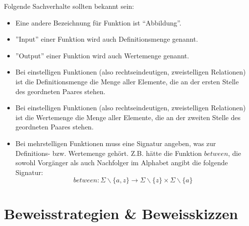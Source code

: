 Folgende Sachverhalte sollten bekannt sein:
\begin{itemize}
    \item Eine andere Bezeichnung für Funktion ist ``Abbildung''.
    \item ''Input'' einer Funktion wird auch Definitionsmenge genannt.
    \item ''Output'' einer Funktion wird auch Wertemenge genannt.
    \item Bei einstelligen Funktionen (also rechtseindeutigen, zweistelligen Relationen)
        ist die Definitionsmenge die Menge aller Elemente,
        die an der ersten Stelle des geordneten Paares stehen.
    \item Bei einstelligen Funktionen (also rechtseindeutigen, zweistelligen Relationen)
        ist die Wertemenge die Menge aller Elemente,
        die an der zweiten Stelle des geordneten Paares stehen.
    \item Bei mehrstelligen Funktionen muss eine Signatur angeben, was zur Definitions-
        bzw. Wertemenge gehört. Z.B. hätte die Funktion $between$,
        die sowohl Vorgänger als auch Nachfolger im Alphabet angibt die folgende Signatur:
        \[ between: 
            \Sigma \backslash \{a,z\}
            \rightarrow
            \Sigma \backslash \{z\} \times \Sigma \backslash \{a\} \]
\end{itemize}

\section{Beweisstrategien \& Beweisskizzen}\label{bew}

